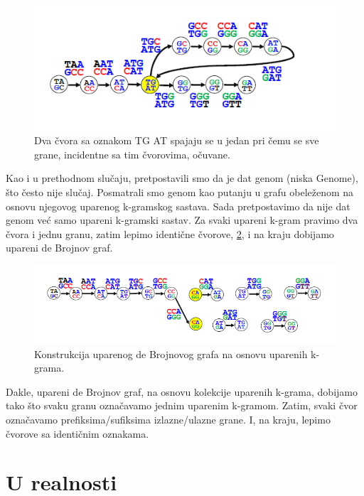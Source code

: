 \begin{figure}[H]
	\centering
	\includegraphics[width=1\textwidth]{poglavlja/3/slike/upareno_lepljenje.png}
	\caption{Dva čvora sa oznakom TG AT spajaju se u jedan pri čemu se sve grane, incidentne sa tim čvorovima, očuvane.}
	\label{slika:uparenoLepljenje}
\end{figure} 


Kao i u prethodnom slučaju, pretpostavili smo da je dat genom (niska Genome), što često nije slučaj. Posmatrali smo genom kao putanju u grafu obeleženom na osnovu njegovog uparenog k-gramskog sastava. Sada pretpostavimo da nije dat genom već samo upareni k-gramski sastav. Za svaki upareni k-gram pravimo dva čvora i jednu granu, zatim lepimo identične čvorove, \ref{slika:uparenoLepljenje2}, i na kraju dobijamo upareni de Brojnov graf.


\begin{figure}[H]
	\centering
	\includegraphics[width=1\textwidth]{poglavlja/3/slike/upareno_lepljenje2.png}
	\caption{Konstrukcija uparenog de Brojnovog grafa na osnovu uparenih k-grama.}
	\label{slika:uparenoLepljenje2}
\end{figure} 


Dakle, upareni de Brojnov graf, na osnovu kolekcije uparenih k-grama, dobijamo tako što svaku granu označavamo jednim uparenim k-gramom. Zatim, svaki čvor označavamo prefiksima/sufiksima izlazne/ulazne grane. I, na kraju, lepimo čvorove sa identičnim oznakama.

\section{U realnosti}

